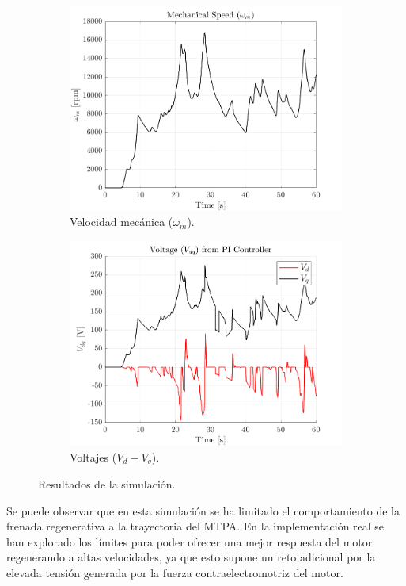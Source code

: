 \begin{figure}[!htb]
\begin{subfigure}{0.4\textwidth}
        \includegraphics[width=\linewidth]{fig/wm_plot.png}
        \caption{Velocidad mecánica ($\omega_{m}$).}
    \end{subfigure}
    \begin{subfigure}{0.4\textwidth}
        \includegraphics[width=\linewidth]{fig/vdvqPI_plot.png}
        \caption{Voltajes ($V_{d} - V_{q}$).}
    \end{subfigure}
    \caption{Resultados de la simulación.}
    
\end{figure}

Se puede observar que en esta simulación se ha limitado el comportamiento de la frenada regenerativa a la trayectoria del MTPA. En la implementación real se han explorado los límites para poder ofrecer una mejor respuesta del motor regenerando a altas velocidades, ya que esto supone un reto adicional por la elevada tensión generada por la fuerza contraelectromotriz del motor.

